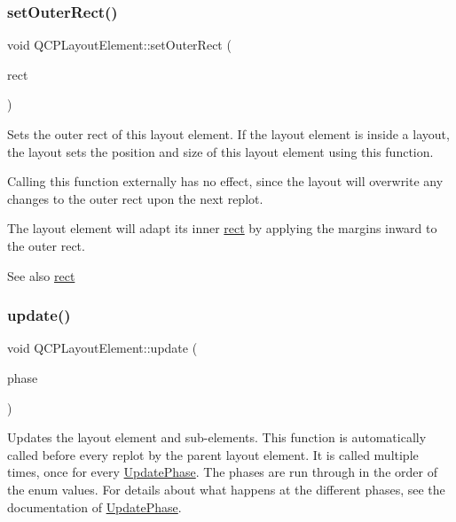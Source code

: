 \subsubsection{\texorpdfstring{set\+Outer\+Rect()}{setOuterRect()}}
{\footnotesize\ttfamily void Q\+C\+P\+Layout\+Element\+::set\+Outer\+Rect (\begin{DoxyParamCaption}\item[{const Q\+Rect \&}]{rect }\end{DoxyParamCaption})}

Sets the outer rect of this layout element. If the layout element is inside a layout, the layout sets the position and size of this layout element using this function.

Calling this function externally has no effect, since the layout will overwrite any changes to the outer rect upon the next replot.

The layout element will adapt its inner \mbox{\hyperlink{class_q_c_p_layout_element_a208effccfe2cca4a0eaf9393e60f2dd4}{rect}} by applying the margins inward to the outer rect.

\begin{DoxySeeAlso}{See also}
\mbox{\hyperlink{class_q_c_p_layout_element_a208effccfe2cca4a0eaf9393e60f2dd4}{rect}} 
\end{DoxySeeAlso}
\mbox{\label{class_q_c_p_layout_element_a929c2ec62e0e0e1d8418eaa802e2af9b}} 
\subsubsection{\texorpdfstring{update()}{update()}}
{\footnotesize\ttfamily void Q\+C\+P\+Layout\+Element\+::update (\begin{DoxyParamCaption}\item[{\mbox{\hyperlink{class_q_c_p_layout_element_a0d83360e05735735aaf6d7983c56374d}{Update\+Phase}}}]{phase }\end{DoxyParamCaption})\hspace{0.3cm}{\ttfamily [virtual]}}

Updates the layout element and sub-\/elements. This function is automatically called before every replot by the parent layout element. It is called multiple times, once for every \mbox{\hyperlink{class_q_c_p_layout_element_a0d83360e05735735aaf6d7983c56374d}{Update\+Phase}}. The phases are run through in the order of the enum values. For details about what happens at the different phases, see the documentation of \mbox{\hyperlink{class_q_c_p_layout_element_a0d83360e05735735aaf6d7983c56374d}{Update\+Phase}}.

